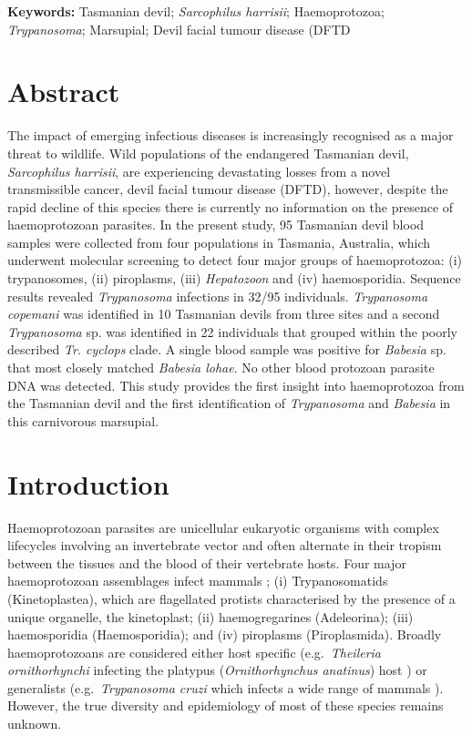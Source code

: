 \documentclass[a4paper, nobind]{templates/ociamthesis}
\begin{document}
\vspace{5mm}

\textbf{Keywords:} Tasmanian devil; \emph{Sarcophilus harrisii}; Haemoprotozoa; \emph{Trypanosoma}; Marsupial; Devil facial tumour disease (DFTD

\newpage

\hypertarget{abstract-4}{%
\section{Abstract}\label{abstract-4}}

The impact of emerging infectious diseases is increasingly recognised as a major threat to wildlife. Wild populations of the endangered Tasmanian devil, \emph{Sarcophilus harrisii}, are experiencing devastating losses from a novel transmissible cancer, devil facial tumour disease (DFTD), however, despite the rapid decline of this species there is currently no information on the presence of haemoprotozoan parasites. In the present study, 95 Tasmanian devil blood samples were collected from four populations in Tasmania, Australia, which underwent molecular screening to detect four major groups of haemoprotozoa: (i) trypanosomes, (ii) piroplasms, (iii) \emph{Hepatozoon} and (iv) haemosporidia. Sequence results revealed \emph{Trypanosoma} infections in 32/95 individuals. \emph{Trypanosoma copemani} was identified in 10 Tasmanian devils from three sites and a second \emph{Trypanosoma} sp. was identified in 22 individuals that grouped within the poorly described \emph{Tr. cyclops} clade. A single blood sample was positive for \emph{Babesia} sp. that most closely matched \emph{Babesia lohae}. No other blood protozoan parasite DNA was detected. This study provides the first insight into haemoprotozoa from the Tasmanian devil and the first identification of \emph{Trypanosoma} and \emph{Babesia} in this carnivorous marsupial.

\hypertarget{introduction-4}{%
\section{Introduction}\label{introduction-4}}

Haemoprotozoan parasites are unicellular eukaryotic organisms with complex lifecycles involving an invertebrate vector and often alternate in their tropism between the tissues and the blood of their vertebrate hosts. Four major haemoprotozoan assemblages infect mammals \autocite{odonoghueHaemoprotozoaMakingBiological2017}; (i) Trypanosomatids (Kinetoplastea), which are flagellated protists characterised by the presence of a unique organelle, the kinetoplast; (ii) haemogregarines (Adeleorina); (iii) haemosporidia (Haemosporidia); and (iv) piroplasms (Piroplasmida). Broadly haemoprotozoans are considered either host specific (e.g.~\emph{Theileria ornithorhynchi} infecting the platypus (\emph{Ornithorhynchus anatinus}) host \autocite{papariniFirstMolecularCharacterization2015}) or generalists (e.g.~\emph{Trypanosoma cruzi} which infects a wide range of mammals \autocite{clementOutAfricaOrigins2020}). However, the true diversity and epidemiology of most of these species remains unknown.
\end{document}

